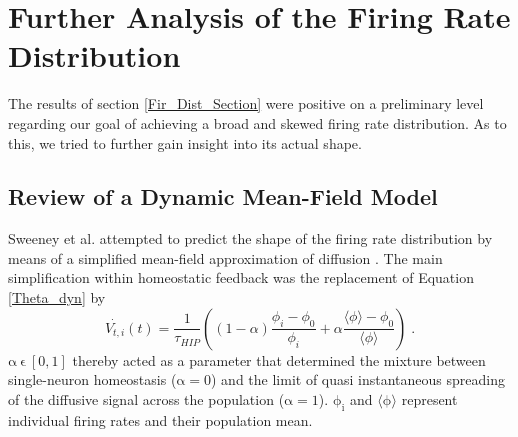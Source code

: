 \documentclass[10pt,a4paper]{article}
\begin{document}
\clearpage

\section{Further Analysis of the Firing Rate Distribution}
The results of section \ref{Fir_Dist_Section} were positive on a preliminary level regarding our goal of achieving a broad and skewed firing rate distribution. As to this, we tried to further gain insight into its actual shape. 
\subsection{Review of a Dynamic Mean-Field Model}\label{Mean_Field_Review_Section}
Sweeney et al. attempted to predict the shape of the firing rate distribution by means of a simplified mean-field approximation of diffusion \cite{Sweeney_Paper}. The main simplification within homeostatic feedback was the replacement of Equation \eqref{Theta_dyn} by
\begin{equation}
\dot{V_{t,i}}(t) = \frac{1}{\tau_{HIP}} \left( (1-\alpha)\frac{\phi_i-\phi_0}{\phi_i} +\alpha \frac{\langle \phi \rangle-\phi_0}{\langle \phi \rangle} \right)\;. 
\label{diff_hom_simpl_sweeney}
\end{equation}
$\mathrm{\alpha \: \epsilon \: [0,1]}$ thereby acted as a parameter that determined the mixture between single-neuron homeostasis ($\mathrm{\alpha=0}$) and the limit of quasi instantaneous spreading of the diffusive signal across the population ($\mathrm{\alpha=1}$). $\mathrm{\phi_i}$ and $\mathrm{\mathrm{\langle \phi \rangle}}$ represent individual firing rates and their population mean.
\end{document}
